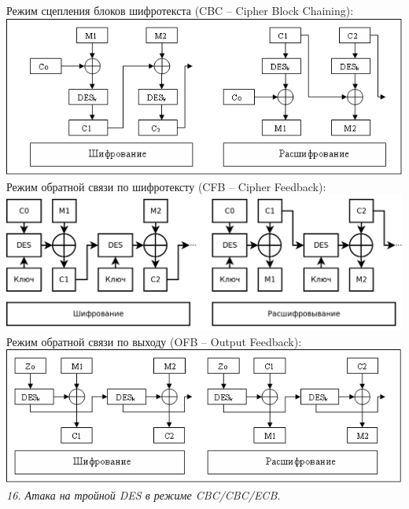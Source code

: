 \noindent Режим сцепления блоков шифротекста (CBC -- Cipher Block Chaining): \\

\includegraphics{eka/img/CBC.png} \\

\noindent Режим обратной связи по шифротексту (CFB -- Cipher Feedback): \\

\includegraphics[scale=.3]{eka/img/CFB.png} \\

\noindent Режим обратной связи по выходу (OFB -- Output Feedback): \\

\includegraphics{eka/img/OFB.png} \\

\newpage
\noindent \textit{16. Атака на тройной DES в режиме CBC/CBC/ECB.} \\

